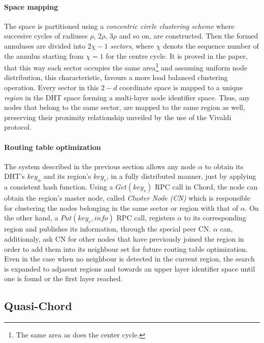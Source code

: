 \documentclass[a4paper,10pt]{article}
\begin{document}
\paragraph{Space mapping}
The space is partitioned using a \emph{concentric circle clustering scheme} where succesive cycles of radiuses $\rho$, $2\rho$, $3\rho$ and so on, are constructed. Then the formed annuluses are divided into $2\chi-1$ \emph{sectors}, where $\chi$ denots the sequence number of the annulus starting from $\chi = 1$ for the centre cycle. It is proved in the paper, that this way each sector occupies the same area\footnote{The same area as does the center cycle.} and assuming uniform node distribution, this characteristic, favours a more load balanced clustering operation. Every sector in this $2-d$ coordinate space is mapped to a unique \emph{region} in the DHT space forming a multi-layer node identifier space. Thus, any nodes that belong to the same sector, are mapped to the same region as well, preserving their proximity relationship unveiled by the use of the Vivaldi protocol.

\paragraph{Routing table optimization}
The system described in the previous section allows any node $\alpha$ to obtain its DHT's $key_{\alpha}$ and its region's $key_r$, in a fully distributed manner, just by applying a consistent hash function. Using a $Get\left( key_r \right)$ RPC call in Chord, the node can obtain the region's master node, called \emph{Cluster Node (CN)} which is responsible for clustering the nodes belonging in the same sector or region with that of $\alpha$. On the other hand, a $Put\left( key_r, info\right)$ RPC call, registers $\alpha$ to its corresponding region and publishes its information, through the special peer CN. $\alpha$ can, additionaly, ask CN for other nodes that have previously joined the region in order to add them into its neighbour set for future routing table optimization. Even in the case when no neighbour is detected in the current region, the search is expanded to adjasent regions and towards an upper layer identifier space until one is found or the first layer reached.

\subsection{Quasi-Chord}
\end{document}
